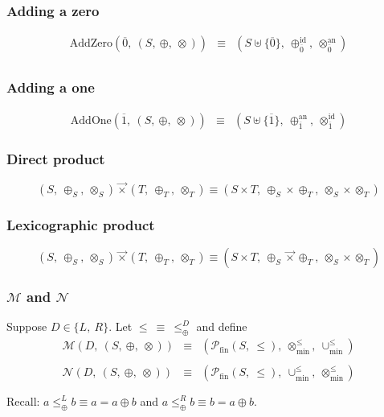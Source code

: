 \documentclass[10pt]{article}
\newcommand{\lexprod}{\ensuremath{\mathbin{\vec{\times}}}}
\newcommand{\minunion}{\cup_{\min}^{\leq}}
\newcommand{\minlift}{\otimes_{\min}^{\leq}}
\begin{document}
\subsubsection{Adding a zero} 
\[ 
\begin{array}{rcl} 
\mathrm{AddZero}(\overline{0},\ (S,\ \oplus,\ \otimes)) 
   & \equiv 
   & (S \uplus \{\overline{0}\},\ \oplus_{\overline{0}}^{\mathrm{id}},\ \otimes_{\overline{0}}^{\mathrm{an}}) \\
\end{array} 
\] 

\subsubsection{Adding a one} 

\[ 
\begin{array}{rcl} 
\mathrm{AddOne}(\overline{1},\ (S,\ \oplus,\ \otimes)) 
   & \equiv 
   & (S \uplus \{\overline{1}\},\  \oplus_{\overline{1}}^{\mathrm{an}},\ \otimes_{\overline{1}}^{\mathrm{id}})
\end{array} 
\] 

\subsubsection{Direct product} 

\[
(S,\ \oplus_S,\ \otimes_S) \lexprod (T,\ \oplus_T,\ \otimes_T) 
\equiv
(S\times T,\ \oplus_S\times\oplus_T,\ \otimes_S\times\otimes_T)
\]


\subsubsection{Lexicographic product} 

\[
(S,\ \oplus_S,\ \otimes_S) \lexprod (T,\ \oplus_T,\ \otimes_T) 
\equiv
(S\times T,\ \oplus_S\lexprod\oplus_T,\ \otimes_S\times\otimes_T)
\]

\subsubsection{$\mathcal{M}$ and $\mathcal{N}$}

Suppose $D \in \{L,\ R\}$. 
Let $\leq \ \equiv \ \leq_\oplus^{D}$ and define 
\[
\begin{array}{rcl} 
\mathcal{M}(D,\ (S,\ \oplus,\ \otimes))   
   & \equiv 
   & (\mathcal{P}_{\mathrm{fin}}(S,\ \leq),\ \minlift,\ \minunion)\\
\\
\mathcal{N}(D,\ (S,\ \oplus,\ \otimes))   
   & \equiv 
   & (\mathcal{P}_{\mathrm{fin}}(S,\ \leq),\ \minunion,\ \minlift)\\
\\
\end{array} 
\] 
Recall: $a \leq_\oplus^{L} b \equiv a = a\oplus b$ 
and $a \leq_\oplus^{R} b \equiv b = a\oplus b$.
\end{document}
